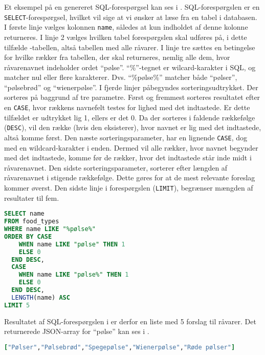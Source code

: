 Et eksempel på en genereret SQL-forespørgsel kan ses i . SQL-forespørgslen er en \texttt{SELECT}-forespørgsel, hvilket vil sige at vi ønsker at læse fra en tabel i databasen. I første linje vælges kolonnen \texttt{name}, således at kun indholdet af denne kolonne returneres. I linje 2 vælges hvilken tabel forespørgslen skal udføres på, i dette tilfælde -tabellen, altså tabellen med alle råvarer. I linje tre sættes en betingelse for hvilke rækker fra tabellen, der skal returneres, nemlig alle dem, hvor råvarenavnet indeholder ordet ``pølse''. ``\%''-tegnet er wilcard-karakter i SQL, og matcher nul eller flere karakterer. Dvs. ``\%pølse\%'' matcher både ``pølser'', ``pølsebrød'' og ``wienerpølse''. I fjerde linjer påbegyndes sorteringsudtrykket. Der sorteres på baggrund af tre parametre. Først og fremmest sorteres resultatet efter en \texttt{CASE}, hvor rækkens navnefelt testes for lighed med det indtastede. Er dette tilfældet er udtrykket lig 1, ellers er det 0. Da der sorteres i faldende rækkefølge (\texttt{DESC}), vil den række (hvis den eksisterer), hvor navnet er lig med det indtastede, altså komme først. Den næste sorteringsparameter, har en lignende \texttt{CASE}, dog med en wildcard-karakter i enden. Dermed vil alle rækker, hvor navnet begynder med det indtastede, komme før de rækker, hvor det indtastede står inde midt i råvarenavnet. Den sidste sorteringsparameter, sorterer efter længden af råvarenavnet i stigende rækkefølge. Dette gøres for at de mest relevante foreslag kommer øverst. Den sidste linje i forespørgslen (\texttt{LIMIT}), begrænser mængden af resultater til fem.

\begin{lstlisting}[caption={Hvis en bruger indtaster ``pølse'' udføres denne SQL-forespørgsel.},label=lst:soegeforslag-sql,language=SQL]
SELECT name
FROM food_types
WHERE name LIKE "%pølse%"
ORDER BY CASE
    WHEN name LIKE "pølse" THEN 1
    ELSE 0
  END DESC,
  CASE
    WHEN name LIKE "pølse%" THEN 1
    ELSE 0
  END DESC,
  LENGTH(name) ASC
LIMIT 5
\end{lstlisting}

Resultatet af SQL-forespørgslen i  er derfor en liste med 5 forslag til råvarer. Det returnerede JSON-array for ``pølse'' kan ses i .

\begin{lstlisting}[caption={Et returneret JSON-array for ``pølse''.},label=lst:poelse-json,language=Ruby]
["Pølser","Pølsebrød","Spegepølse","Wienerpølse","Røde pølser"]
\end{lstlisting}

